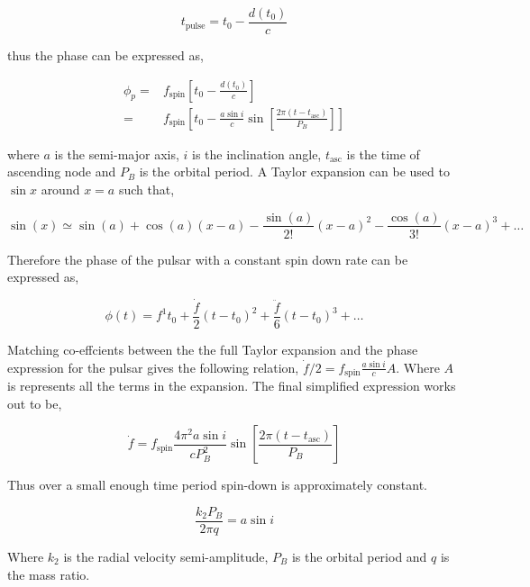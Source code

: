 \begin{equation}
    t_{\text{pulse}} = t_0 - \frac{d(t_0)}{c}
\end{equation}

thus the phase can be expressed as,

\begin{align}
    \phi_p = & f_{\text{spin}}\left[ t_0 - \frac{d(t_0)}{c}\right] \\ 
    = & f_\text{spin} \left[ t_0 - \frac{a \sin i}{c} \sin \left[ \frac{2 \pi (t - t_{\text{asc}})}{P_B} \right] \right]
\end{align}

where $a$ is the semi-major axis, $i$ is the inclination angle, $t_{\text{asc}}$ is the time of ascending node and $P_B$ is the orbital period. A Taylor expansion can be used to $\sin x$ around $x = a$ such that, 

\begin{equation}
    \sin (x) \simeq   \sin (a) + \cos (a)(x - a) - \frac{\sin (a)}{2!}(x - a)^2 - \frac{\cos (a)}{3!}(x - a)^3 + \ldots
\end{equation}

Therefore the phase of the pulsar with a constant spin down rate can be expressed as, 

\begin{equation}
  \phi(t) = f^1 t_0 + \frac{\dot f}{2} (t - t_0)^2 + \frac{\ddot f}{6} (t - t_0)^3 + \ldots 
\end{equation}

Matching co-effcients between the the full Taylor expansion and the phase expression for the pulsar gives the following relation, $\dot f/2 = f_{\text{spin}} \frac{a \sin i}{c} A$. Where $A$ is represents all the terms in the expansion. The final simplified expression works out to be, 

\begin{equation}
    \dot f = f_\text{spin} \frac{4 \pi^2 a \sin i }{cP^2_B} \sin \left[ \frac{2 \pi (t - t_{\text{asc}})}{P_B} \right]
\end{equation}

Thus over a small enough time period spin-down is approximately constant.

\begin{equation}
    \frac{k_2 P_B}{2 \pi q} = a \sin i   
    \label{eq:constant_accel}
\end{equation}

Where $k_2$ is the radial velocity semi-amplitude, $P_B$ is the orbital period and $q$ is the mass ratio.

